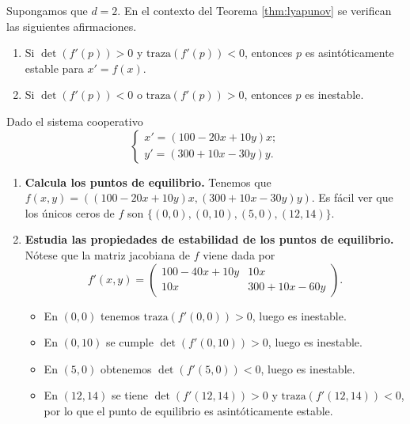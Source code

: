 \begin{corollary}
  Supongamos que $d = 2$. En el contexto del Teorema \ref{thm:lyapunov} se verifican las siguientes
  afirmaciones.
  \begin{enumerate}
  \item Si $\det(f'(p)) > 0$ y $\mathrm{traza}(f'(p)) < 0$, entonces $p$ es asintóticamente estable
    para $x' = f(x)$.
  \item Si $\det(f'(p)) < 0$ o $\mathrm{traza}(f'(p)) > 0$, entonces $p$ es inestable.
  \end{enumerate}
\end{corollary}

\begin{ex}
  Dado el sistema cooperativo
  \begin{equation}
    \label{eq:cooperativo}
    \begin{cases}
      x' = (100 − 20 x + 10 y)x;\\
      y' = (300 + 10 x − 30 y)y.
    \end{cases}
  \end{equation}
  \begin{enumerate}
  \item \textbf{Calcula los puntos de equilibrio.} Tenemos que
    $f(x,y) = ((100-20x+10y)x, (300+10x-30y)y)$. Es fácil ver que los únicos ceros de $f$ son
    $\{(0,0), (0,10), (5,0), (12,14)\}$.
  \item \textbf{Estudia las propiedades de estabilidad de los puntos de equilibrio.} Nótese que la
    matriz jacobiana de $f$ viene dada por
    \[ f'(x,y) = \left( \begin{matrix}
          100 -40x +10y & 10x \\
          10x & 300 +10x-60y
        \end{matrix} \right).

    \]
    \begin{itemize}
    \item En $(0,0)$ tenemos $\mathrm{traza}(f'(0,0)) > 0$, luego es inestable.
    \item En $(0,10)$ se cumple $\det(f'(0,10)) > 0$, luego es inestable.
    \item En $(5,0)$ obtenemos $\det(f'(5,0)) < 0$, luego es inestable.
    \item En $(12,14)$ se tiene $\det(f'(12,14)) > 0$ y $\mathrm{traza}(f'(12,14)) < 0$, por lo que
      el punto de equilibrio es asintóticamente estable. \qedhere
    \end{itemize}
  \end{enumerate}
\end{ex}

